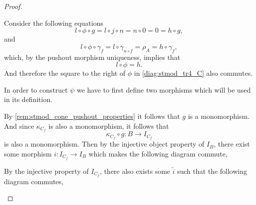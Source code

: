 \begin{proof}
\begin{enumerate}[label={(\bfseries TR\arabic*)}]
{\begin{center}
            \end{center}
            Consider the following equations
            \[
                l \circ \phi \circ g = l \circ j \circ n = n \circ 0 = 0 = h \circ g,
            \]
            and
            \[
                l \circ \phi \circ \gamma_f = l \circ \gamma_{n \circ f} = \rho_A = h \circ \gamma_f,
            \]
            which, by the pushout morphism uniqueness, implies that
            \[
                l \circ \phi = h.
            \]
            And therefore the square to the right of \( \phi \) in \autoref{diag:stmod_tr4_C} also commutes.

            In order to construct \( \psi \) we have to first define two morphisms which will be used in its definition.

            By \autoref{rem:stmod_cone_pushout_properties} it follows that \( g \) is a monomorphism. And since \( \kappa_{C_f} \) is also a monomorphism, it follows that
            \[
                \kappa_{C_f} \circ g: B \to I_{C_f}
            \]
            is also a monomorphism. Then by the injective object property of \( I_B \), there exist some morphism \( i: I_{C_f} \to I_B \) which makes the following diagram commute,
            \begin{center}
            \end{center}
            By the injective property of \( I_{C_f} \), there also exists some \( \tilde{i} \) such that the following diagram commutes,
            \begin{center}
\end{center}}
\end{enumerate}
\end{proof}

